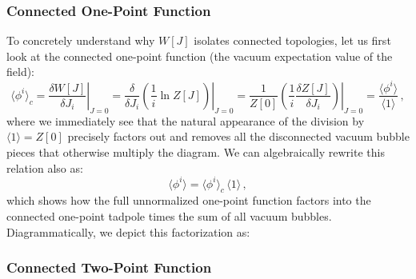 \subsubsection{Connected One-Point Function}

To concretely understand why \(W[J]\) isolates connected topologies, let us first look at the connected one-point function (the vacuum expectation value of the field):
\begin{equation} \label{eq:connected_one_point}
    \langle \phi^i \rangle_c = \left. \frac{\delta W[J]}{\delta J_i} \right|_{J=0} = \left. \frac{\delta}{\delta J_i} \left(\frac{1}{i} \ln Z[J]\right) \right|_{J=0} = \left. \frac{1}{Z[0]} \left(\frac{1}{i} \frac{\delta Z[J]}{\delta J_i}\right) \right|_{J=0} = \frac{\langle \phi^i \rangle}{\langle 1 \rangle} \, ,
\end{equation}
where we immediately see that the natural appearance of the division by \(\langle 1 \rangle = Z[0]\) precisely factors out and removes all the disconnected vacuum bubble pieces that otherwise multiply the diagram. We can algebraically rewrite this relation also as:
\begin{equation} \label{eq:one_point_factorization}
    \langle \phi^i \rangle = \langle \phi^i \rangle_c \, \langle 1 \rangle \, ,
\end{equation}
which shows how the full unnormalized one-point function factors into the connected one-point tadpole times the sum of all vacuum bubbles. Diagrammatically, we depict this factorization as:


\subsubsection{Connected Two-Point Function}

